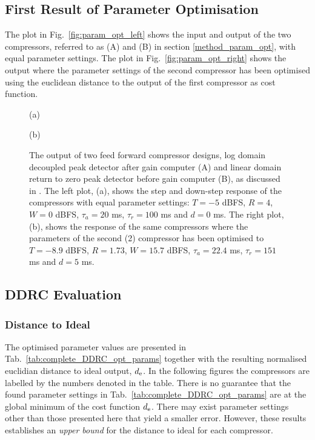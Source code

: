 \documentclass[../main2.tex]{subfiles}
\providecommand{\rootdir}{..}
\begin{document}
\subsection{First Result of Parameter Optimisation}
The plot in Fig.~\ref{fig:param_opt_left} shows the input and output of the two compressors, referred to as (A) and (B) in section \ref{method_param_opt}, with equal parameter settings. The plot in Fig.~\ref{fig:param_opt_right} shows the output where the parameter settings of the second compressor has been optimised using the euclidean distance to the output of the first compressor as cost function. 
\begin{figure}[ht]
\captionsetup*{justification=centering}
\begin{minipage}[t]{.5\textwidth}
 \centering

\caption*{(a)} 
\label{fig:param_opt_left}
\end{minipage}%
\begin{minipage}[t]{.5\textwidth}
\centering

\caption*{(b)} 
\label{fig:param_opt_right}
\end{minipage}
\caption{The output of two feed forward compressor designs, log domain decoupled peak detector after gain computer (A) and linear domain return to zero peak detector before gain computer (B), as discussed in \cite{reiss2012tutorial}. The left plot, (a), shows the step and down-step response of the compressors with equal parameter settings: $T = -5$ dBFS, $R=4$, $W=0$ dBFS, $\tau_a = 20$ ms, $\tau_r = 100$ ms and $d=0$ ms. The right plot, (b), shows the response of the same compressors where the parameters of the second (2) compressor has been optimised to $T = -8.9$ dBFS, $R=1.73$, $W=15.7$ dBFS, $\tau_a = 22.4$ ms, $\tau_r = 151$ ms and $d=5$ ms.}
\label{fig:param_opt}
\end{figure}

\subsection{DDRC Evaluation}

\subsubsection{Distance to Ideal}
The optimised parameter values are presented in Tab.~\ref{tab:complete_DDRC_opt_params} together with the resulting normalised euclidian distance to ideal output, $d_\text{e}$. In the following figures the compressors are labelled by the numbers denoted in the table. There is no guarantee that the found parameter settings in Tab.~\ref{tab:complete_DDRC_opt_params} are at the global minimum of the cost function $d_\text{e}$. There may exist parameter settings other than those presented here that yield a smaller error. However, these results establishes an \emph{upper bound} for the distance to ideal for each compressor.
\end{document}
